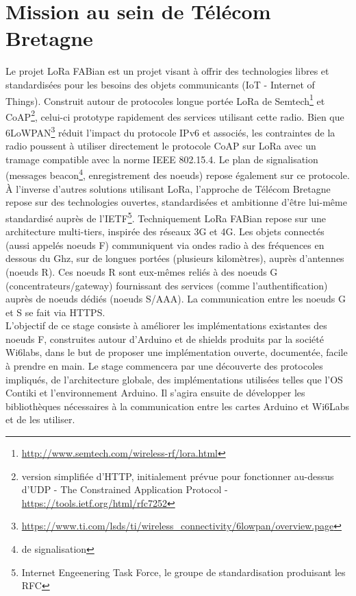 \documentclass{article}
\begin{document}
\section{Mission au sein de Télécom Bretagne}
Le projet LoRa FABian est un projet visant à offrir des technologies libres et standardisées pour les besoins des objets communicants (IoT - Internet of Things). Construit autour de protocoles longue portée LoRa de Semtech\footnote{\url{http://www.semtech.com/wireless-rf/lora.html}} et CoAP\footnote{version simplifiée d'HTTP, initialement prévue pour fonctionner au-dessus d'UDP - The Constrained Application Protocol - \url{https://tools.ietf.org/html/rfc7252}}, celui-ci prototype rapidement des services utilisant cette radio. Bien que 6LoWPAN\footnote{\url{https://www.ti.com/lsds/ti/wireless_connectivity/6lowpan/overview.page}} réduit l’impact du protocole IPv6 et associés, les contraintes de la radio poussent à utiliser directement le protocole CoAP sur LoRa avec un tramage compatible avec la norme IEEE 802.15.4. Le plan de signalisation (messages beacon\footnote{de signalisation}, enregistrement des noeuds) repose également sur ce protocole. À l'inverse d'autres solutions utilisant LoRa, l'approche de Télécom Bretagne repose sur des technologies ouvertes, standardisées et ambitionne d'être lui-même standardisé auprès de l'IETF\footnote{Internet Engeenering Task Force, le groupe de standardisation produisant les RFC}. Techniquement LoRa FABian repose sur une architecture multi-tiers, inspirée des réseaux 3G et 4G. Les objets connectés (aussi appelés noeuds F) communiquent via ondes radio à des fréquences en dessous du Ghz, sur de longues portées (plusieurs kilomètres), auprès d'antennes (noeuds R). Ces noeuds R sont eux-mêmes reliés à des noeuds G (concentrateurs/gateway) fournissant des services (comme l'authentification) auprès de noeuds dédiés (noeuds S/AAA). La communication entre les noeuds G et S se fait via HTTPS.\\

L'objectif de ce stage consiste à améliorer les implémentations existantes des noeuds F, construites autour d'Arduino et de shields produits par la société Wi6labs, dans le but de proposer une implémentation ouverte, documentée, facile à prendre en main. Le stage commencera par une découverte des protocoles impliqués, de l'architecture globale, des implémentations utilisées telles que l'OS Contiki et l'environnement Arduino. Il s’agira ensuite de développer les bibliothèques nécessaires à la communication entre les cartes Arduino et Wi6Labs et de les utiliser.\\
\end{document}
